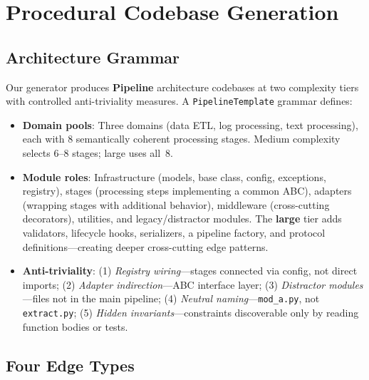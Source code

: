 \documentclass{article}
\begin{document}
\section{Procedural Codebase Generation}
\label{sec:generation}

\subsection{Architecture Grammar}

Our generator produces \textbf{Pipeline} architecture codebases at two complexity tiers with controlled anti-triviality measures. A \texttt{PipelineTemplate} grammar defines:

\begin{itemize}[nosep]
    \item \textbf{Domain pools}: Three domains (data ETL, log processing, text processing), each with 8 semantically coherent processing stages. Medium complexity selects 6--8 stages; large uses all~8.
    \item \textbf{Module roles}: Infrastructure (models, base class, config, exceptions, registry), stages (processing steps implementing a common ABC), adapters (wrapping stages with additional behavior), middleware (cross-cutting decorators), utilities, and legacy/distractor modules. The \textbf{large} tier adds validators, lifecycle hooks, serializers, a pipeline factory, and protocol definitions---creating deeper cross-cutting edge patterns.
    \item \textbf{Anti-triviality}: (1) \emph{Registry wiring}---stages connected via config, not direct imports; (2) \emph{Adapter indirection}---ABC interface layer; (3) \emph{Distractor modules}---files not in the main pipeline; (4) \emph{Neutral naming}---\texttt{mod\_a.py}, not \texttt{extract.py}; (5) \emph{Hidden invariants}---constraints discoverable only by reading function bodies or tests.
\end{itemize}

\subsection{Four Edge Types}
\end{document}
